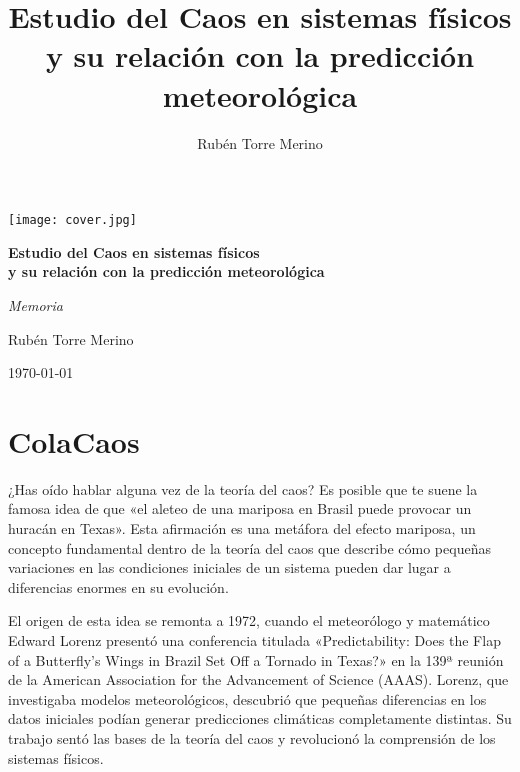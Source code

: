\documentclass[
  10pt,
  a4paper,
  DIV=11,
  numbers=noendperiod,
  open=any]{scrreprt}
\title{Estudio del Caos en sistemas físicos y su relación con la
predicción meteorológica}
\author{Rubén Torre Merino}
\date{}
\numberwithin{equation}{chapter}
\renewcommand{\contentsname}{Tabla de contenidos}
\renewcommand*\contentsname{Table of contents}
\newcommand\contentsname{Table of contents}
\numberwithin{equation}{chapter}
\renewcommand{\[}{\begin{equation}}
\renewcommand{\]}{\end{equation}}
\begin{document}
\maketitle

\begin{titlepage}
  \centering
  \vspace*{-1cm}
  \texttt{[image: cover.jpg]}\par
  \vspace{1.2cm}

  {\Huge\bfseries\color{Main} Estudio del Caos en sistemas físicos\\[2mm]
  y su relación con la predicción meteorológica\par}

  \vspace{0.8cm}
  {\Large\color{gray!60} \textit{Memoria}}\par

  \vspace{1.2cm}
  {\Large Rubén Torre Merino}\par

  \vfill
  {\large \today}\par
\end{titlepage}

\renewcommand*\contentsname{Table of contents}
{
\hypersetup{linkcolor=}
\setcounter{tocdepth}{0}
\tableofcontents
}


\chapter{ColaCaos}\label{colacaos}

¿Has oído hablar alguna vez de la teoría del caos? Es posible que te
suene la famosa idea de que «el aleteo de una mariposa en Brasil puede
provocar un huracán en Texas». Esta afirmación es una metáfora del
efecto mariposa, un concepto fundamental dentro de la teoría del caos
que describe cómo pequeñas variaciones en las condiciones iniciales de
un sistema pueden dar lugar a diferencias enormes en su evolución.

El origen de esta idea se remonta a 1972, cuando el meteorólogo y
matemático Edward Lorenz presentó una conferencia titulada
«Predictability: Does the Flap of a Butterfly's Wings in Brazil Set Off
a Tornado in Texas?» en la 139ª reunión de la American Association for
the Advancement of Science (AAAS). Lorenz, que investigaba modelos
meteorológicos, descubrió que pequeñas diferencias en los datos
iniciales podían generar predicciones climáticas completamente
distintas. Su trabajo sentó las bases de la teoría del caos y
revolucionó la comprensión de los sistemas físicos.
\end{document}
